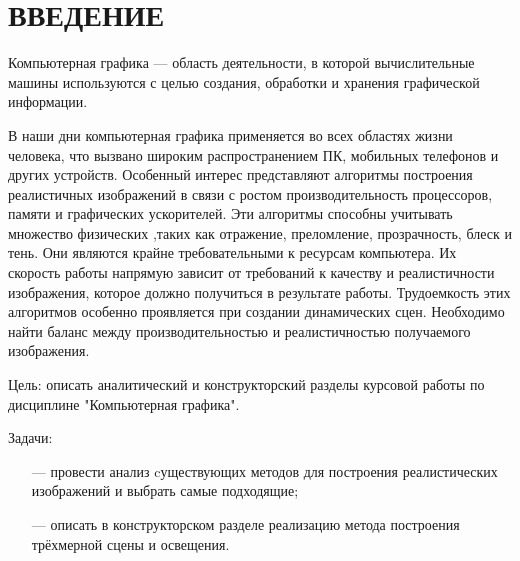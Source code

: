 \section*{ВВЕДЕНИЕ}

Компьютерная графика — область деятельности, в которой вычислительные машины 	используются с целью создания, обработки и хранения графической информации.

В наши дни компьютерная графика применяется во всех областях жизни человека, что вызвано широким распространением ПК, мобильных телефонов и других устройств. Особенный интерес представляют алгоритмы построения реалистичных изображений в связи с ростом производительность процессоров, памяти и графических ускорителей. Эти алгоритмы способны учитывать множество физических ,таких как отражение, преломление, прозрачность, блеск и тень. Они являются крайне требовательными к ресурсам компьютера. Их скорость работы напрямую зависит от требований к качеству и реалистичности изображения, которое должно получиться в результате работы. Трудоемкость этих алгоритмов особенно проявляется при создании динамических сцен. Необходимо найти баланс между производительностью и реалистичностью получаемого изображения.

Цель: описать аналитический и конструкторский разделы курсовой работы по дисциплине "Компьютерная графика".

Задачи:
\begin{enumerate}
	\item[---] провести анализ cуществующих методов для построения реалистических изображений и выбрать самые подходящие;
	\item[---] описать в конструкторском разделе реализацию метода построения трёхмерной сцены и освещения.
\end{enumerate}

\pagebreak